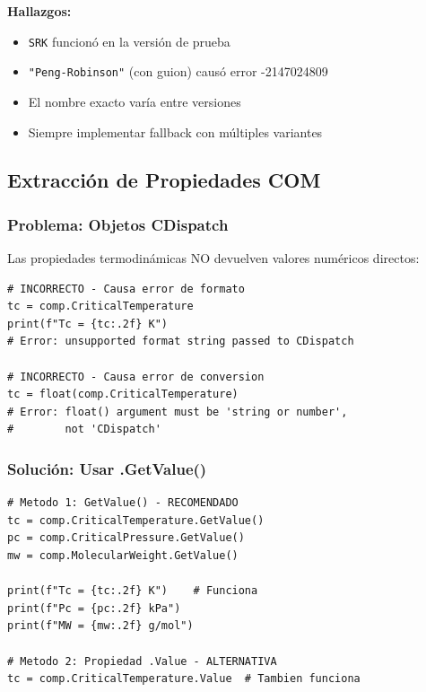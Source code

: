 \documentclass[12pt,a4paper]{article}
\begin{document}
\begin{infobox}
\textbf{Hallazgos:}
\begin{itemize}
    \item \texttt{SRK} funcionó en la versión de prueba
    \item \texttt{"Peng-Robinson"} (con guion) causó error -2147024809
    \item El nombre exacto varía entre versiones
    \item Siempre implementar fallback con múltiples variantes
\end{itemize}
\end{infobox}

\subsection{Extracción de Propiedades COM}

\subsubsection{Problema: Objetos CDispatch}

Las propiedades termodinámicas NO devuelven valores numéricos directos:

\begin{lstlisting}
# INCORRECTO - Causa error de formato
tc = comp.CriticalTemperature
print(f"Tc = {tc:.2f} K")
# Error: unsupported format string passed to CDispatch

# INCORRECTO - Causa error de conversion
tc = float(comp.CriticalTemperature)
# Error: float() argument must be 'string or number',
#        not 'CDispatch'
\end{lstlisting}

\subsubsection{Solución: Usar .GetValue()}

\begin{successbox}
\begin{lstlisting}
# Metodo 1: GetValue() - RECOMENDADO
tc = comp.CriticalTemperature.GetValue()
pc = comp.CriticalPressure.GetValue()
mw = comp.MolecularWeight.GetValue()

print(f"Tc = {tc:.2f} K")    # Funciona
print(f"Pc = {pc:.2f} kPa")
print(f"MW = {mw:.2f} g/mol")

# Metodo 2: Propiedad .Value - ALTERNATIVA
tc = comp.CriticalTemperature.Value  # Tambien funciona
\end{lstlisting}
\end{successbox}
\end{document}
